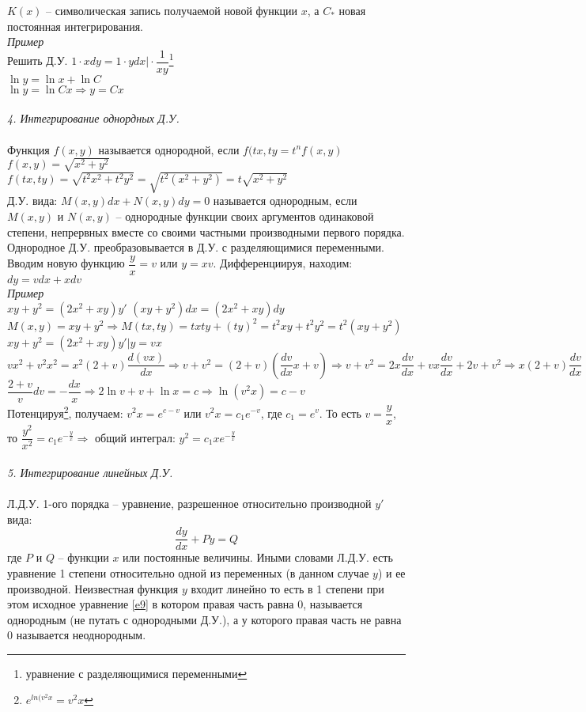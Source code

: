 \documentclass{article}
\numberwithin{equation}{section}
\begin{document}
$K(x)$ -- символическая запись получаемой новой функции $x$, а $C_*$ новая постоянная интегрирования.\\
\textit{Пример}\\
Решить Д.У. $1\cdot xdy=1\cdot ydx\bigg|\cdot\dfrac{1}{xy}$\footnote{уравнение с разделяющимися переменными}\\
$\ln y=\ln x+\ln C$\\
$\ln y=\ln Cx\Rightarrow y=Cx$\\\\
\textit{4. Интегрирование однордных Д.У.}\\\\
Функция $f(x,y)$ называется однородной, если $f(tx,ty=t^nf(x,y)$ $f(x,y)=\sqrt{x^2+y^2}$\\
$f(tx,ty)=\sqrt{t^2x^2+t^2y^2}=\sqrt{t^2(x^2+y^2)}=t\sqrt{x^2+y^2}$\\
Д.У. вида: $M(x,y)dx+N(x,y)dy=0$ называется однородным, если $M(x,y)$ и $N(x,y)$ -- однородные функции своих аргументов одинаковой степени, непрервных вместе со своими частными производными первого порядка. Однородное Д.У. преобразовывается в Д.У. с разделяющимися переменными. Вводим новую функцию $\dfrac{y}{x}=v$ или $y=xv$. Дифференциируя, находим: $dy=vdx+xdv$\\
\textit{Пример}\\
$xy+y^2=(2x^2+xy)y'$ $(xy+y^2)dx=(2x^2+xy)dy$\\
$M(x,y)=xy+y^2\Rightarrow M(tx,ty)=txty+(ty)^2=t^2xy+t^2y^2=t^2(xy+y^2)$\\
$xy+y^2=(2x^2+xy)y'\bigg|y=vx$\\
$vx^2+v^2x^2=x^2(2+v)\dfrac{d(vx)}{dx}\Rightarrow v+v^2=(2+v)(\dfrac{dv}{dx}x+v)\Rightarrow v+v^2=2x\dfrac{dv}{dx}+vx\dfrac{dv}{dx}+2v+v^2\Rightarrow x(2+v)\dfrac{dv}{dx}=-v\bigg|\dfrac{dx}{x\cdot v}$\\
$\dfrac{2+v}{v}dv=-\dfrac{dx}{x}\Rightarrow 2\ln v+v+\ln x=c\Rightarrow\ln(v^2x)=c-v$\\
Потенцируя\footnote{$e^{ln(v^2x}=v^2x$}, получаем: $v^2x=e^{c-v}$ или $v^2x=c_1e^{-v}$, где $c_1=e^v$. То есть $v=\dfrac{y}{x}$, то $\dfrac{y^2}{x^2}=c_1e^{-\frac{y}{x}}\Rightarrow$ общий интеграл: $y^2=c_1xe^{-\frac{y}{x}}$\\\\
\textit{5. Интегрирование линейных Д.У.}\\\\
Л.Д.У. 1-ого порядка -- уравнение, разрешенное относительно производной $y'$ вида:
\begin{equation}\label{e9}
\dfrac{dy}{dx}+Py=Q
\end{equation}
где $P$ и $Q$ -- функции $x$ или постоянные величины. Иными словами Л.Д.У. есть уравнение 1 степени относительно одной из переменных (в данном случае $y$) и ее производной. Неизвестная функция $y$ входит линейно то есть в 1 степени при этом исходное уравнение \eqref{e9} в котором правая часть равна 0, называется однородным (не путать с однородными Д.У.), а у которого правая часть не равна 0 называется неоднородным.
\end{document}
